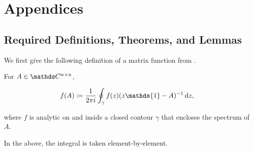 \section*{Appendices}

\renewcommand{\thesection}{\Alph{subsection}}
\setcounter{subsection}{0}
\subsection{Required Definitions, Theorems, and Lemmas}

We first give the following definition of a matrix function from \cite{higham2008functions}.
\label{appendix:lemmas}
\begin{definition}
For $A \in \bC^{n\times n}$, 

\begin{align}
f(A) \coloneqq \frac{1}{2\pi i}\oint_\gamma f(z)(z\mathds{1} - A)^{-1} \, \rmd z, 
\end{align}

where $f$ is analytic on and inside a closed contour $\gamma$ that encloses the spectrum of $A$. 
\end{definition}

In the above, the integral is taken element-by-element. 

